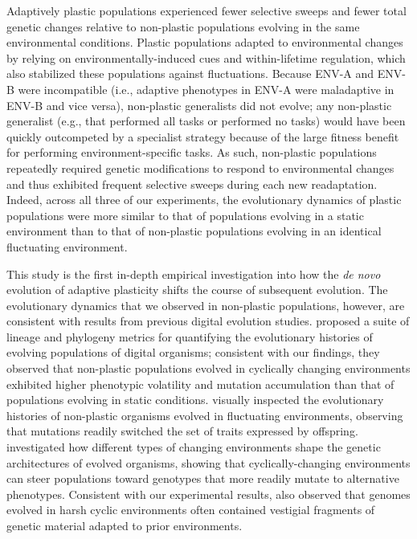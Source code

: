 Adaptively plastic populations experienced fewer selective sweeps and fewer total genetic changes relative to non-plastic populations evolving in the same environmental conditions.
Plastic populations adapted to environmental changes by relying on environmentally-induced cues and within-lifetime regulation, which also stabilized these populations against fluctuations. 
Because ENV-A and ENV-B were incompatible (i.e., adaptive phenotypes in ENV-A were maladaptive in ENV-B and vice versa), non-plastic generalists did not evolve; any non-plastic generalist (e.g., that performed all tasks or performed no tasks) would have been quickly outcompeted by a specialist strategy because of the large fitness benefit for performing environment-specific tasks.
As such, non-plastic populations repeatedly required genetic modifications to respond to environmental changes and thus exhibited frequent selective sweeps during each new readaptation.
Indeed, across all three of our experiments, the evolutionary dynamics of plastic populations were more similar to that of populations evolving in a static environment than to that of non-plastic populations evolving in an identical fluctuating environment.


This study is the first in-depth empirical investigation into how the \textit{de novo} evolution of adaptive plasticity shifts the course of subsequent evolution.
The evolutionary dynamics that we observed in non-plastic populations, however, are consistent with results from previous digital evolution studies. 
\cite{dolson_interpreting_2020} proposed a suite of lineage and phylogeny metrics for quantifying the evolutionary histories of evolving populations of digital organisms; consistent with our findings, they observed that non-plastic populations evolved in cyclically changing environments exhibited higher phenotypic volatility and mutation accumulation than that of populations evolving in static conditions.
\cite{lalejini_evolutionary_2016} visually inspected the evolutionary histories of non-plastic organisms evolved in fluctuating environments, observing that mutations readily switched the set of traits expressed by offspring.
\cite{canino-koning_evolution_2016} investigated how different types of changing environments shape the genetic architectures of evolved organisms, showing that cyclically-changing environments can steer populations toward genotypes that more readily mutate to alternative phenotypes.
Consistent with our experimental results, \cite{canino-koning_evolution_2016} also observed that genomes evolved in harsh cyclic environments often contained vestigial fragments of genetic material adapted to prior environments.

